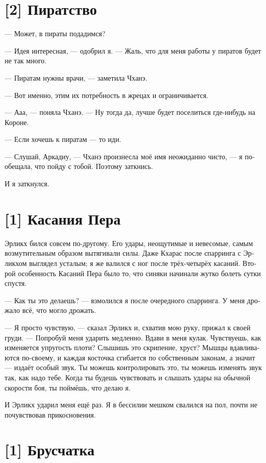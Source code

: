 \documentclass[a4paper,12pt,fleqn]{book}\usepackage{polyglossia}\setdefaultlanguage[babelshorthands=true]{russian}\setotherlanguage{english}\defaultfontfeatures{Ligatures=TeX,Mapping=tex-text}\usepackage{xcolor}\newcommand{\ml}[3]{#2}
\begin{document}
{\section{[2] Пиратство}

--- Может, в пираты подадимся?

--- Идея интересная, --- одобрил я.
--- Жаль, что для меня работы у пиратов будет не так много.

--- Пиратам нужны врачи, --- заметила Чханэ.

--- Вот именно, этим их потребность в жрецах и ограничивается.

--- Ааа, --- поняла Чханэ.
--- Ну тогда да, лучше будет поселиться где-нибудь на Короне.

--- Если хочешь к пиратам --- то иди.

--- Слушай, Аркадиу, --- Чханэ произнесла моё имя неожиданно чисто, --- я пообещала, что пойду с тобой.
Поэтому заткнись.

И я заткнулся.

\section{[1] Касания Пера}

Эрликх бился совсем по-другому.
Его удары, неощутимые и невесомые, самым возмутительным образом вытягивали силы.
Даже Кхарас после спарринга с Эрликхом выглядел усталым;
я же валился с ног после трёх-четырёх касаний.
Второй особенность Касаний Пера было то, что синяки начинали жутко болеть сутки спустя.

--- Как ты это делаешь? --- взмолился я после очередного спарринга.
У меня дрожало всё, что могло дрожать.

--- Я просто чувствую, --- сказал Эрликх и, схватив мою руку, прижал к своей груди.
--- Попробуй меня ударить медленно.
Вдави в меня кулак.
Чувствуешь, как изменяется упругость плоти?
Слышишь это скрипение, хруст?
Мышцы вдавливаются по-своему, и каждая косточка сгибается по собственным законам, а значит --- издаёт особый звук.
Ты можешь контролировать это, ты можешь изменять звук так, как надо тебе.
Когда ты будешь чувствовать и слышать удары на обычной скорости боя, ты поймёшь, что делаю я.

И Эрликх ударил меня ещё раз.
Я в бессилии мешком свалился на пол, почти не почувствовав прикосновения.

\section{[1] Брусчатка}

}
\end{document}
